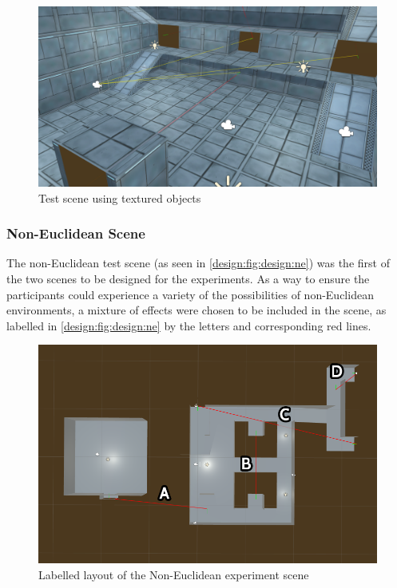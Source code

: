 		\begin{figure}[H]
			\includegraphics[width=1\textwidth]{Images/Lines_Everywhere}
			\centering
			\caption{Test scene using textured objects}
			\label{design:fig:design:tex}
		\end{figure}

		\subsubsection{Non-Euclidean Scene}

			The non-Euclidean test scene (as seen in \autoref{design:fig:design:ne}) was the first of the two scenes to be designed for the experiments.
			As a way to ensure the participants could experience a variety of the possibilities of non-Euclidean environments, a mixture of effects were chosen to be included in the scene, as labelled in \autoref{design:fig:design:ne} by the letters and corresponding red lines.

			\begin{figure}[H]
				\includegraphics[width=1\textwidth]{Images/NE_Layout}
				\centering
				\caption{Labelled layout of the Non-Euclidean experiment scene}
				\label{design:fig:design:ne}
			\end{figure}

